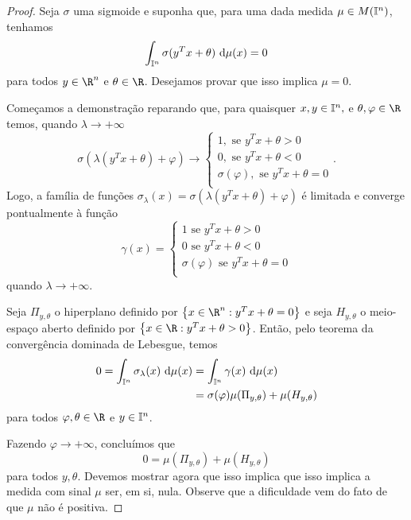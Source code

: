 \begin{proof}
    Seja \( \sigma \) uma sigmoide e suponha que, para uma dada medida \( \mu \in M(\mathbb{I}^{ n }) \), tenhamos \[
        \int_{ \I^{ n } } \sigma(y^{ T }x + \theta) \ \mathrm{d}\mu(x) = 0
    \]
    para todos \( y \in \R^{ n } \) e \( \theta \in \R \).
    Desejamos provar que isso implica \( \mu = 0 \).

    Começamos a demonstração reparando que, para quaisquer \( x, y \in \mathbb{I}^{ n },\) e \( \theta, \varphi \in \R \) temos, quando \( \lambda \to +\infty \) \[
        \sigma(\lambda(y^{ T }x + \theta) + \varphi)
        \to
        \begin{cases}
            1, \text{ se } y^{ T }x + \theta > 0 \\
            0, \text{ se } y^{ T }x + \theta < 0 \\
            \sigma(\varphi), \text{ se } y^{ T }x + \theta = 0 \\
        \end{cases}
    .\]
    Logo, a família de funções \( \sigma_{ \lambda }(x) = \sigma(\lambda(y^{ T }x + \theta) + \varphi) \) é limitada e converge pontualmente à função \[
        \gamma(x) =
        \begin{cases}
            1 \text{ se } y^{ T }x + \theta > 0 \\
            0 \text{ se } y^{ T }x + \theta < 0 \\
            \sigma(\varphi) \text{ se } y^{ T }x + \theta = 0 \\
        \end{cases}
    \]
    quando \( \lambda \to +\infty \).

    Seja \( \Pi_{ y, \theta } \) o hiperplano definido por \( \left\{ x \in \R^{ n } : y^{ T }x + \theta = 0 \right\} \) e seja \( H_{ y, \theta } \) o meio-espaço aberto definido por \( \left\{ x \in \R : y^{ T }x + \theta > 0 \right\} \).
    Então, pelo teorema da convergência dominada de Lebesgue, temos %
    \begin{align*}
        0 =
        \int_{ \mathbb{I}^{ n } } \sigma_{ \lambda }(x)  \ \mathrm{d}\mu(x) &= \int_{ \mathbb{I}^{ n } } \gamma(x) \ \mathrm{d}\mu(x) \\
        &= \sigma(\varphi)\mu(\Pi_{ y, \theta }) + \mu(H_{ y, \theta })
    \end{align*}
    para todos \( \varphi, \theta \in \R \) e \( y \in \mathbb{I}^{ n } \).

    Fazendo \( \varphi \to +\infty \), concluímos que \[
        0 = \mu(\Pi_{ y, \theta }) + \mu(H_{ y, \theta })
    \]
    para todos \( y, \theta \).
    Devemos mostrar agora que isso implica que isso implica a medida com sinal \( \mu \) ser, em si, nula.
    Observe que a dificuldade vem do fato de que \( \mu \) não é positiva.


\end{proof}
